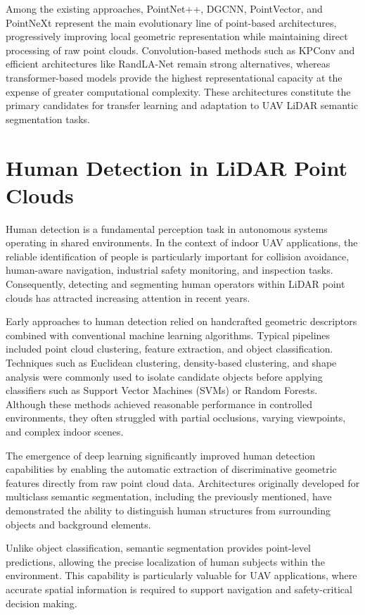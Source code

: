 Among the existing approaches, PointNet++, DGCNN, PointVector, and PointNeXt represent the main evolutionary line of point-based architectures, progressively improving local geometric representation while maintaining direct processing of raw point clouds. Convolution-based methods such as KPConv and efficient architectures like RandLA-Net remain strong alternatives, whereas transformer-based models provide the highest representational capacity at the expense of greater computational complexity. These architectures constitute the primary candidates for transfer learning and adaptation to UAV LiDAR semantic segmentation tasks.\cite{pang2022pointmae}
\section{Human Detection in LiDAR Point Clouds}
\label{sec:human_detection}

Human detection is a fundamental perception task in autonomous systems operating in shared environments. In the context of indoor UAV applications, the reliable identification of people is particularly important for collision avoidance, human-aware navigation, industrial safety monitoring, and inspection tasks. Consequently, detecting and segmenting human operators within LiDAR point clouds has attracted increasing attention in recent years.

Early approaches to human detection relied on handcrafted geometric descriptors combined with conventional machine learning algorithms. Typical pipelines included point cloud clustering, feature extraction, and object classification. Techniques such as Euclidean clustering, density-based clustering, and shape analysis were commonly used to isolate candidate objects before applying classifiers such as Support Vector Machines (SVMs) or Random Forests. Although these methods achieved reasonable performance in controlled environments, they often struggled with partial occlusions, varying viewpoints, and complex indoor scenes.

The emergence of deep learning significantly improved human detection capabilities by enabling the automatic extraction of discriminative geometric features directly from raw point cloud data. Architectures originally developed for  multiclass semantic segmentation, including the previously mentioned, have demonstrated the ability to distinguish human structures from surrounding objects and background elements.\cite{Lorente2021PedestrianPointNet}

Unlike object classification, semantic segmentation provides point-level predictions, allowing the precise localization of human subjects within the environment. This capability is particularly valuable for UAV applications, where accurate spatial information is required to support navigation and safety-critical decision making.

